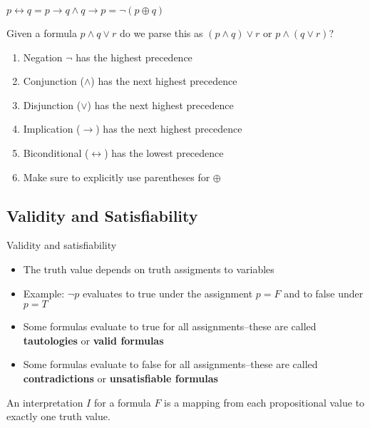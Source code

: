 \documentclass[8pt]{scrreprt}
\begin{document}
\begin{landscape}
\begin{multicols*}{3}
\begin{definition}[Contrapositive]
\end{definition}

\begin{definition}[Biconditionals]
	$p\leftrightarrow q = p\rightarrow q \land q\rightarrow p = \neg (p\oplus q)$
\end{definition}

\begin{example}
	Given a formula $p\land q \lor r$ do we parse this as $(p\land q)\lor r$ or $p\land (q\lor r)$?

	\begin{enumerate}
		\item Negation $\neg$ has the highest precedence
		\item Conjunction ($\land$) has the next highest precedence
		\item Disjunction ($\lor$) has the next highest precedence
		\item Implication ($\rightarrow$) has the next highest precedence
		\item Biconditional ($\leftrightarrow$) has the lowest precedence
		\item Make sure to explicitly use parentheses for $\oplus$
	\end{enumerate}
\end{example}

\subsection{Validity and Satisfiability}

Validity and satisfiability
\begin{itemize}
	\item The truth value depends on truth assigments to variables
	\item Example: $\neg p$ evaluates to true under the assignment $p=F$ and to false under $p=T$
	\item Some formulas evaluate to true for all assignments--these are called \textbf{tautologies} or \textbf{valid formulas}
	\item Some formulas evaluate to false for all assignments--these are called \textbf{contradictions} or \textbf{unsatisfiable formulas}
\end{itemize}

\begin{definition}[Interpretation]
	An interpretation $I$ for a formula $F$ is a mapping from each propositional
	value to exactly one truth value.


\end{definition}
\end{multicols*}
\end{landscape}
\end{document}
